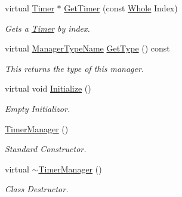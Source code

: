 \begin{DoxyCompactItemize}
virtual \hyperlink{classphys_1_1Timer}{Timer} $\ast$ \hyperlink{classphys_1_1TimerManager_a5e2912df5f17cd8af1ab8457b95c5a75}{GetTimer} (const \hyperlink{namespacephys_a460f6bc24c8dd347b05e0366ae34f34a}{Whole} Index)
\begin{DoxyCompactList}\small\item\em Gets a \hyperlink{classphys_1_1Timer}{Timer} by index. \item\end{DoxyCompactList}\item 
virtual \hyperlink{classphys_1_1ManagerBase_aaa6ccddf23892eaccb898529414f80a5}{ManagerTypeName} \hyperlink{classphys_1_1TimerManager_a716811f51cb9e97ed6e9db310f34e9dc}{GetType} () const 
\begin{DoxyCompactList}\small\item\em This returns the type of this manager. \item\end{DoxyCompactList}\item 
virtual void \hyperlink{classphys_1_1TimerManager_ab6ee47352a406682178b4496544bcf6f}{Initialize} ()
\begin{DoxyCompactList}\small\item\em Empty Initializor. \item\end{DoxyCompactList}\item 
\hypertarget{classphys_1_1TimerManager_a53e30a8cb528de39ac94937781b96d39}{
\hyperlink{classphys_1_1TimerManager_a53e30a8cb528de39ac94937781b96d39}{TimerManager} ()}
\label{classphys_1_1TimerManager_a53e30a8cb528de39ac94937781b96d39}

\begin{DoxyCompactList}\small\item\em Standard Constructor. \item\end{DoxyCompactList}\item 
\hypertarget{classphys_1_1TimerManager_a75bcaca5c292ecfb62ad46a6156b7d87}{
virtual \hyperlink{classphys_1_1TimerManager_a75bcaca5c292ecfb62ad46a6156b7d87}{$\sim$TimerManager} ()}
\label{classphys_1_1TimerManager_a75bcaca5c292ecfb62ad46a6156b7d87}

\begin{DoxyCompactList}\small\item\em Class Destructor. \item\end{DoxyCompactList}\end{DoxyCompactItemize}
